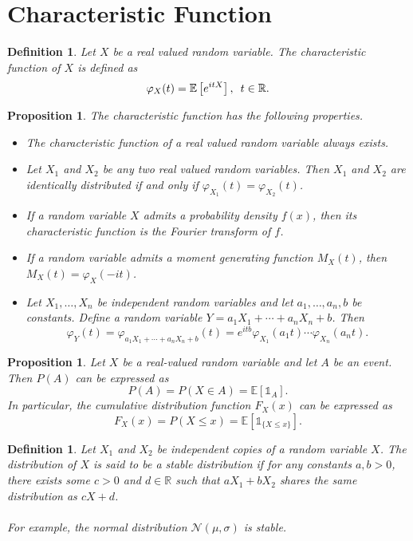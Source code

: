 \documentclass[1pt]{report}
\newtheorem{prop}[thm]{Proposition}
\newtheorem{defn}[thm]{Definition}
\newcommand{\Rone}{\mathbb{R}}
\newcommand{\R}{\Rone}
\newcommand{\id}{\mathds{1}}
\newcommand{\<}{\langle}
\renewcommand{\>}{\rangle}
\newcommand{\E}{\mathbb{E}}
\newcommand{\NN}{\mathcal{N}}
\let\phi\varphi
\begin{document}
\section{Characteristic Function}
\begin{defn} \label{def:characteristicfunction}
Let $X$ be a real valued random variable. The \emph{characteristic function} of $X$ is defined as 
$$\phi_X(t) = \E\left[e^{itX}\right], \enskip t \in \R.$$
\end{defn}
\begin{prop}\label{prop:characteristicproperties}
The characteristic function has the following properties.
\begin{itemize}
\item The characteristic function of a real valued random variable always exists.
\item Let $X_1$ and $X_2$ be any two real valued random variables. Then $X_1$ and $X_2$ are identically distributed if and only if $\phi_{X_1}(t) = \phi_{X_2}(t)$. 
\item If a random variable $X$ admits a probability density $f(x)$, then its characteristic function is the Fourier transform of $f$.
\item If a random variable admits a moment generating function $M_X(t)$, then $M_X(t)= \phi_X(-it)$.
\item Let $X_1, \dots, X_n$ be independent random variables and let \linebreak$a_1,\dots, a_n, b$ be constants. Define a random variable \linebreak $Y = a_1X_1 + \cdots + a_nX_n + b$. Then 
$$\phi_Y(t) = \phi_{a_1X_1 + \cdots + a_n X_n + b}(t) = e^{itb}\phi_{X_1}(a_1t) \cdots \phi_{X_n}(a_n t).$$
\end{itemize}
\end{prop}
\begin{prop}\label{prop:indicatorcdf}
Let $X$ be a real-valued random variable and let $A$ be an event. Then $P(A)$ can be expressed as
$$P(A) = P(X \in A) = \E\left[\id_A\right].$$
In particular, the cumulative distribution function $F_X(x)$ can be expressed as
$$F_X(x) = P(X\leq x) = \E\left[\id_{\{X\leq x\}}\right].$$
\end{prop}
\begin{defn}
Let $X_1$ and $X_2$ be independent copies of a random variable $X$. The distribution of $X$ is said to be a \emph{stable distribution} if for any constants $a,b >0$, there exists some $c>0$ and $d\in \R$ such that $aX_1 + bX_2$ shares the same distribution as $cX + d$.\\
\\
For example, the normal distribution $\NN(\mu,\sigma)$ is stable.
\end{defn}
\end{document}

